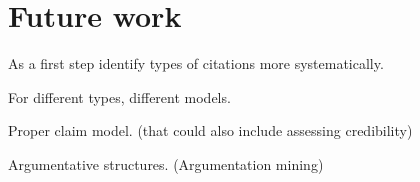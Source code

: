 \chapter{Future work}
As a first step identify types of citations more systematically.

For different types, different models.

Proper claim model. (that could also include assessing credibility\cite{Popat2016})

Argumentative structures. (Argumentation mining\cite{Stab2016,Lippi2016,Habernal2017})
